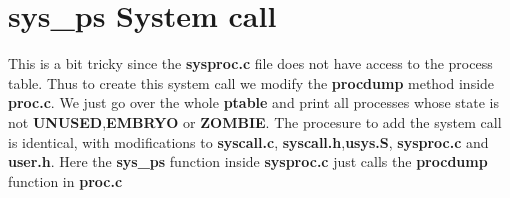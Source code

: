 \documentclass[12pt,a4paper]{article}
\begin{document}
\section{sys\_ps System call}
This is a bit tricky since the \textbf{sysproc.c} file does not have access to the process table. Thus to create this system call we modify the \textbf{procdump} method inside \textbf{proc.c}. We just go over the whole \textbf{ptable} and print all processes whose state is not \textbf{UNUSED},\textbf{EMBRYO} or \textbf{ZOMBIE}. The procesure to add the system call is identical, with modifications to \textbf{syscall.c}, \textbf{syscall.h},\textbf{usys.S}, \textbf{sysproc.c} and \textbf{user.h}. Here the \textbf{sys\_ps} function inside \textbf{sysproc.c} just calls the \textbf{procdump} function in \textbf{proc.c}
\end{document}
